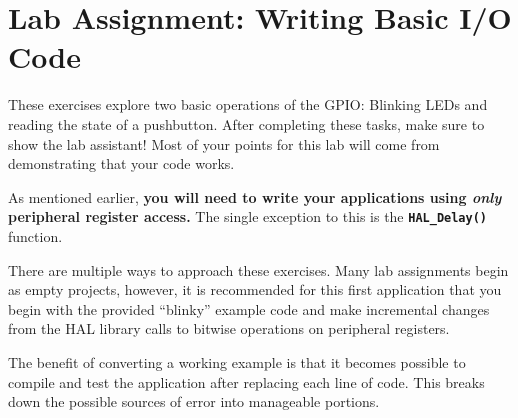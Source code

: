 \documentclass[11pt,fleqn]{book} %
\newcommand{\code}[3]{
    \begin{figure}[]
        \begin{center}
            \hspace*{-3.4cm}
            \colorbox{gray!20!white}{
                \parbox{0.8\paperwidth} {
                    
                }
            }
            \caption{#2}
            \label{#3}
        \end{center}
    \end{figure}
}
\begin{document}
%
%

\section{Lab Assignment: Writing Basic I/O Code}

These exercises explore two basic operations of the GPIO: Blinking LEDs and reading the state of a pushbutton.
After completing these tasks, make sure to show the lab assistant! Most of your points for this lab will come from demonstrating that your code works. 
\begin{warning}
As mentioned earlier, \textbf{you will need to write your applications using \textit{only} peripheral register access.} The single exception to this is the \texttt{\textbf{HAL\_Delay()}} function.
\end{warning}

There are multiple ways to approach these exercises. Many lab assignments begin as empty projects, however, it is recommended for this first application that you begin with the provided ``blinky'' example code and make incremental changes from the HAL library calls to bitwise operations on peripheral registers.

The benefit of converting a working example is that it becomes possible to compile and test the application after replacing each line of code. This breaks down the possible sources of error into manageable portions. 
\end{document}
